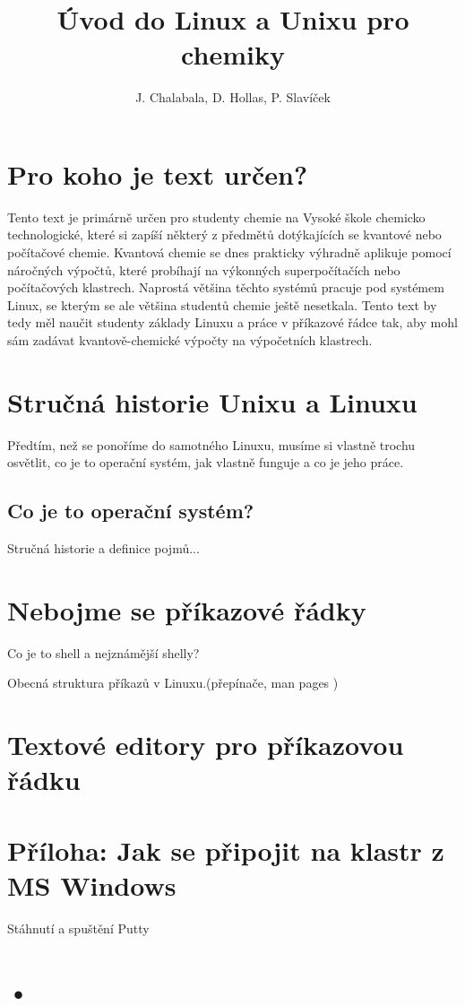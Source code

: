\documentclass[a4paper,12pt]{article}
\title{Úvod do Linux a Unixu pro chemiky}
\author{J. Chalabala, D. Hollas, P. Slavíček}
\begin{document}
\pagestyle{empty}
\maketitle

\tableofcontents

\pagestyle{plain}

\clearpage
\section{Pro koho je text určen?}

Tento text je primárně určen pro studenty chemie na Vysoké škole chemicko technologické, které si zapíší některý z předmětů dotýkajících se kvantové nebo počítačové chemie. Kvantová chemie se dnes prakticky výhradně aplikuje pomocí náročných výpočtů, které probíhají na výkonných superpočítačích nebo počítačových klastrech. Naprostá většina těchto systémů pracuje pod systémem Linux, se kterým se ale většina studentů chemie ještě nesetkala. Tento text by tedy měl naučit studenty základy Linuxu a práce v příkazové řádce tak, aby mohl sám zadávat kvantově-chemické výpočty na výpočetních klastrech. 

\clearpage
\section{Stručná historie Unixu a Linuxu}
Předtím, než se ponoříme do samotného Linuxu, musíme si vlastně trochu osvětlit, co je to operační systém,
jak vlastně funguje a co je jeho práce.

\subsection{Co je to operační systém?}

Stručná historie a definice pojmů...

\clearpage
\section{Nebojme se příkazové řádky}

Co je to shell a nejznámější shelly?

Obecná struktura příkazů v Linuxu.(přepínače, man pages )

\clearpage
\section{Textové editory pro příkazovou řádku}

\clearpage
\section{Příloha: Jak se připojit na klastr z MS Windows}

Stáhnutí a spuštění Putty

\clearpage
\section{•}
\end{document}
